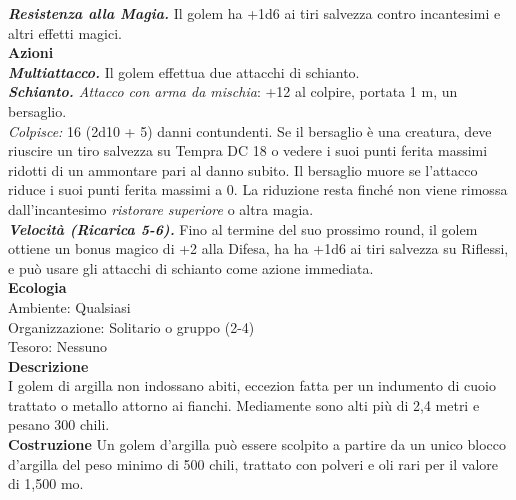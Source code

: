 \begin{multicols}{2}
\emph{\textbf{Resistenza alla Magia.}} Il golem ha +1d6 ai tiri salvezza contro incantesimi e altri effetti magici.\\
\smallskip\textbf{Azioni} \\
\emph{\textbf{Multiattacco.}} Il golem effettua due attacchi di schianto.\\
\emph{\textbf{Schianto.} Attacco con arma da mischia}: +12 al colpire, portata 1 m, un bersaglio.\\
\emph{Colpisce:} 16 (2d10 + 5) danni contundenti. Se il bersaglio è una creatura, deve riuscire un tiro salvezza su Tempra DC  18 o vedere i suoi punti ferita massimi ridotti di un ammontare pari al danno subito. Il bersaglio muore se l'attacco riduce i suoi punti ferita massimi a 0. La riduzione resta finché non viene rimossa dall'incantesimo \emph{ristorare superiore} o altra magia.\\
\emph{\textbf{Velocità (Ricarica 5-6).}} Fino al termine del suo prossimo round, il golem ottiene un bonus magico di +2 alla Difesa, ha ha +1d6 ai tiri salvezza su Riflessi, e può usare gli attacchi di schianto come azione immediata.\\
\textbf{Ecologia}\\
Ambiente: Qualsiasi\\
Organizzazione: Solitario o gruppo (2-4)\\
Tesoro: Nessuno\\
\textbf{Descrizione}\\
I golem di argilla non indossano abiti, eccezion fatta per un indumento di cuoio trattato o metallo attorno ai fianchi. Mediamente sono alti più di 2,4 metri e pesano 300 chili.\\
\textbf{Costruzione}
Un golem d'argilla può essere scolpito a partire da un unico blocco d'argilla del peso minimo di 500 chili, trattato con polveri e oli rari per il valore di 1,500 mo.\\


\end{multicols}

